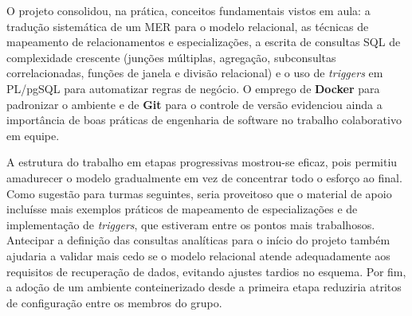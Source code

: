 \documentclass[12pt]{article}
\begin{document}
O projeto consolidou, na prática, conceitos fundamentais vistos em aula: a tradução sistemática de um MER para o modelo relacional, as técnicas de mapeamento de relacionamentos e especializações, a escrita de consultas SQL de complexidade crescente (junções múltiplas, agregação, subconsultas correlacionadas, funções de janela e divisão relacional) e o uso de \textit{triggers} em PL/pgSQL para automatizar regras de negócio. O emprego de \textbf{Docker} para padronizar o ambiente e de \textbf{Git} para o controle de versão evidenciou ainda a importância de boas práticas de engenharia de software no trabalho colaborativo em equipe.

A estrutura do trabalho em etapas progressivas mostrou-se eficaz, pois permitiu amadurecer o modelo gradualmente em vez de concentrar todo o esforço ao final. Como sugestão para turmas seguintes, seria proveitoso que o material de apoio incluísse mais exemplos práticos de mapeamento de especializações e de implementação de \textit{triggers}, que estiveram entre os pontos mais trabalhosos. Antecipar a definição das consultas analíticas para o início do projeto também ajudaria a validar mais cedo se o modelo relacional atende adequadamente aos requisitos de recuperação de dados, evitando ajustes tardios no esquema. Por fim, a adoção de um ambiente conteinerizado desde a primeira etapa reduziria atritos de configuração entre os membros do grupo.
\end{document}
